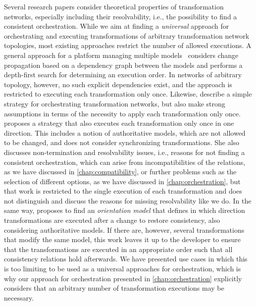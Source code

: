 Several research papers consider theoretical properties of transformation networks, especially including their resolvability, i.e., the possibility to find a consistent orchestration.
While we aim at finding a \emph{universal} approach for orchestrating and executing transformations of arbitrary transformation network topologies, most existing approaches restrict the number of allowed executions.
A general approach for a platform managing multiple models~\cite{denton2008naomi-Models} considers change propagation based on a dependency graph between the models and performs a depth-first search for determining an execution order.
In networks of arbitrary topology, however, no such explicit dependencies exist, and the approach is restricted to executing each transformation only once.
Likewise, \textcite{dirocco2017ConsistencyRecoveryInteractive-MODELS} describe a simple strategy for orchestrating transformation networks, but also make strong assumptions in terms of the necessity to apply each transformation only once.
\textcite{stevens2020BidirectionalTransformationLarge-SoSym} proposes a strategy that also executes each transformation only once in one direction. This includes a notion of authoritative models, which are not allowed to be changed, and does not consider synchronizing transformations.
She also discusses non-termination and resolvability issues, i.e., reasons for not finding a consistent orchestration, which can arise from incompatibilities of the relations, as we have discussed in \autoref{chap:compatibility}, or further problems such as the selection of different options, as we have discussed in \autoref{chap:orchestration}, but that work is restricted to the single execution of each transformation and does not distinguish and discuss the reasons for missing resolvability like we do.
In the same way, \textcite{stevens2020BuildingFromMegamodels-SoSym} proposes to find an \emph{orientation model} that defines in which direction transformations are executed after a change to restore consistency, also considering authoritative models.
If there are, however, several transformations that modify the same model, this work leaves it up to the developer to ensure that the transformations are executed in an appropriate order such that all consistency relations hold afterwards.
We have presented use cases in which this is too limiting to be used as a universal approaches for orchestration, which is why our approach for orchestration presented in \autoref{chap:orchestration} explicitly considers that an arbitrary number of transformation executions may be necessary.


